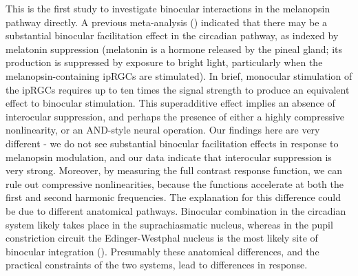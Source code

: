 \documentclass[
]{article}
\begin{document}
This is the first study to investigate binocular interactions in the melanopsin pathway directly. A previous meta-analysis () indicated that there may be a substantial binocular facilitation effect in the circadian pathway, as indexed by melatonin suppression (melatonin is a hormone released by the pineal gland; its production is suppressed by exposure to bright light, particularly when the melanopsin-containing ipRGCs are stimulated). In brief, monocular stimulation of the ipRGCs requires up to ten times the signal strength to produce an equivalent effect to binocular stimulation. This superadditive effect implies an absence of interocular suppression, and perhaps the presence of either a highly compressive nonlinearity, or an AND-style neural operation. Our findings here are very different - we do not see substantial binocular facilitation effects in response to melanopsin modulation, and our data indicate that interocular suppression is very strong. Moreover, by measuring the full contrast response function, we can rule out compressive nonlinearities, because the functions accelerate at both the first and second harmonic frequencies. The explanation for this difference could be due to different anatomical pathways. Binocular combination in the circadian system likely takes place in the suprachiasmatic nucleus, whereas in the pupil constriction circuit the Edinger-Westphal nucleus is the most likely site of binocular integration (). Presumably these anatomical differences, and the practical constraints of the two systems, lead to differences in response.
\end{document}
